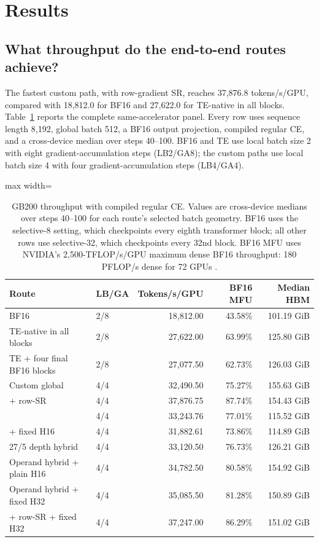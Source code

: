 \section{Results}
\label{sec:results}

\subsection{What throughput do the end-to-end routes achieve?}

The fastest custom path, \mxfp{} with row-gradient SR, reaches 37,876.8
tokens/s/GPU, compared with
18,812.0 for BF16 and 27,622.0 for TE-native \nvfp{} in all blocks.
Table~\ref{tab:gb200-throughput} reports the complete same-accelerator panel.
Every row uses sequence length 8,192, global batch 512, a BF16 output
projection, compiled regular CE, and a cross-device median over steps 40--100.
BF16 and TE use local batch size 2 with eight gradient-accumulation steps
(LB2/GA8); the custom paths use local batch size 4 with four
gradient-accumulation steps (LB4/GA4).

\begin{table}[H]
  \centering
  \caption{GB200 throughput with compiled regular CE. Values are cross-device
  medians over steps 40--100 for each route's selected batch geometry. BF16
  uses the selective-8 setting, which checkpoints every eighth transformer
  block; all other rows use selective-32, which checkpoints every 32nd block.
  BF16 MFU uses NVIDIA's 2,500-TFLOP/s/GPU maximum dense BF16 throughput:
  180 PFLOP/s dense for 72 GPUs \cite{nvidia2025blackwell}.}
  \label{tab:gb200-throughput}
  \begin{adjustbox}{max width=\textwidth}
  \begin{tabular}{ll@{\qquad}rrr}
    \toprule
    Route & LB/GA & Tokens/s/GPU & BF16 MFU & Median HBM \\
    \midrule
    BF16 & 2/8 & 18,812.00 & 43.58\% & 101.19 GiB \\
    TE-native \nvfp{} in all blocks & 2/8 & 27,622.00 & 63.99\% & 125.80 GiB \\
    TE \nvfp{} + four final BF16 blocks & 2/8 & 27,077.50 & 62.73\% & 126.03 GiB \\
    Custom global \nvfp{} & 4/4 & 32,490.50 & 75.27\% & 155.63 GiB \\
    \mxfp{} + row-SR & 4/4 & 37,876.75 & 87.74\% & 154.43 GiB \\
    \localcta{} & 4/4 & 33,243.76 & 77.01\% & 115.52 GiB \\
    \localcta{} + fixed H16 & 4/4 & 31,882.61 & 73.86\% & 114.89 GiB \\
    27/5 depth hybrid & 4/4 & 33,120.50 & 76.73\% & 126.21 GiB \\
    Operand hybrid + plain H16 & 4/4 & 34,782.50 & 80.58\% & 154.92 GiB \\
    Operand hybrid + fixed H32 & 4/4 & 35,085.50 & 81.28\% & 150.89 GiB \\
    \mxfp{} + row-SR + fixed H32 & 4/4 & 37,247.00 & 86.29\% & 151.02 GiB \\
    \bottomrule
  \end{tabular}
  \end{adjustbox}
\end{table}

